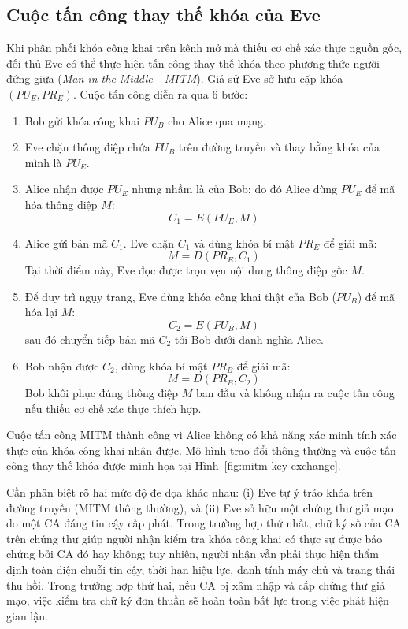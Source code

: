 \subsection{Cuộc tấn công thay thế khóa của Eve}
\label{subsec:eve-mitm-attack}
Khi phân phối khóa công khai trên kênh mở mà thiếu cơ chế xác thực nguồn gốc, đối thủ Eve có thể thực hiện tấn công thay thế khóa theo phương thức người đứng giữa (\textit{Man-in-the-Middle - MITM}). Giả sử Eve sở hữu cặp khóa $(PU_E, PR_E)$. Cuộc tấn công diễn ra qua 6 bước:
\begin{enumerate}
    \item Bob gửi khóa công khai $PU_B$ cho Alice qua mạng.
    \item Eve chặn thông điệp chứa $PU_B$ trên đường truyền và thay bằng khóa của mình là $PU_E$.
    \item Alice nhận được $PU_E$ nhưng nhầm là của Bob; do đó Alice dùng $PU_E$ để mã hóa thông điệp $M$:
    \begin{equation}
        C_1 = E(PU_E, M)
    \end{equation}
    \item Alice gửi bản mã $C_1$. Eve chặn $C_1$ và dùng khóa bí mật $PR_E$ để giải mã:
    \begin{equation}
        M = D(PR_E, C_1)
    \end{equation}
    Tại thời điểm này, Eve đọc được trọn vẹn nội dung thông điệp gốc $M$.
    \item Để duy trì ngụy trang, Eve dùng khóa công khai thật của Bob ($PU_B$) để mã hóa lại $M$:
    \begin{equation}
        C_2 = E(PU_B, M)
    \end{equation}
    sau đó chuyển tiếp bản mã $C_2$ tới Bob dưới danh nghĩa Alice.
    \item Bob nhận được $C_2$, dùng khóa bí mật $PR_B$ để giải mã:
    \begin{equation}
        M = D(PR_B, C_2)
    \end{equation}
    Bob khôi phục đúng thông điệp $M$ ban đầu và không nhận ra cuộc tấn công nếu thiếu cơ chế xác thực thích hợp.
\end{enumerate}

Cuộc tấn công MITM thành công vì Alice không có khả năng xác minh tính xác thực của khóa công khai nhận được. Mô hình trao đổi thông thường và cuộc tấn công thay thế khóa được minh họa tại Hình~\ref{fig:mitm-key-exchange}.

Cần phân biệt rõ hai mức độ đe dọa khác nhau: (i) Eve tự ý tráo khóa trên đường truyền (MITM thông thường), và (ii) Eve sở hữu một chứng thư giả mạo do một CA đáng tin cậy cấp phát. Trong trường hợp thứ nhất, chữ ký số của CA trên chứng thư giúp người nhận kiểm tra khóa công khai có thực sự được bảo chứng bởi CA đó hay không; tuy nhiên, người nhận vẫn phải thực hiện thẩm định toàn diện chuỗi tin cậy, thời hạn hiệu lực, danh tính máy chủ và trạng thái thu hồi. Trong trường hợp thứ hai, nếu CA bị xâm nhập và cấp chứng thư giả mạo, việc kiểm tra chữ ký đơn thuần sẽ hoàn toàn bất lực trong việc phát hiện gian lận.

